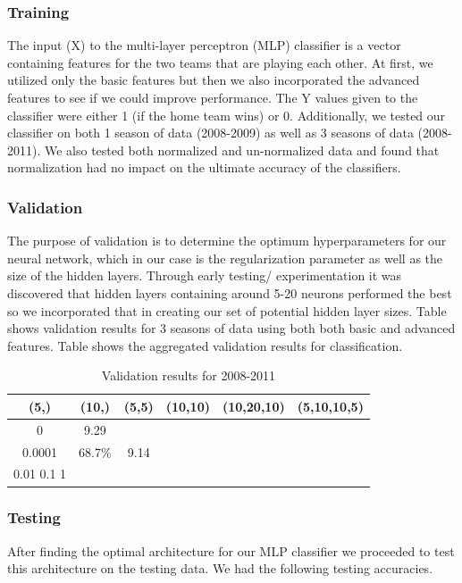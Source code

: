 \documentclass{article}
\begin{document}
\subsubsection{Training}
The input (X) to the multi-layer perceptron (MLP) classifier is a vector containing features for the two teams that are playing each other. At first, we utilized only the basic features but then we also incorporated the advanced features to see if we could improve performance. The Y values given to the classifier were either 1 (if the home team wins) or 0. Additionally, we tested our classifier on both 1 season of data (2008-2009) as well as 3 seasons of data (2008-2011). We also tested both normalized and un-normalized data and found that normalization had no impact on the ultimate accuracy of the classifiers. 

\subsubsection{Validation}
The purpose of validation is to determine the optimum hyperparameters for our neural network, which in our case is the regularization parameter as well as the size of the hidden layers. Through early testing/ experimentation it was discovered that hidden layers containing around 5-20 neurons performed the best so we incorporated that in creating our set of potential hidden layer sizes. Table shows validation results for 3 seasons of data using both both basic and advanced features. Table shows the aggregated validation results for classification.

\begin{table}
  \begin{center}
    \begin{tabular}{ | c | c | c | c | c | c | }
      \hline
                         	(5,) & 	(10,) & 	(5,5) &  	(10,10) & 	(10,20,10) & 	(5,10,10,5)  \\ \hline
	0       	            & 9.29         \\ \hline
	0.0001      & 68.7\%            & 9.14         \\ \hline
	0.01
	0.1
	1
    \end{tabular}
  \end{center}
  \caption{Validation results for 2008-2011}
\end{table}

\subsubsection{Testing}
After finding the optimal architecture for our MLP classifier we proceeded to test this architecture on the testing data. We had the following testing accuracies.
\end{document}
